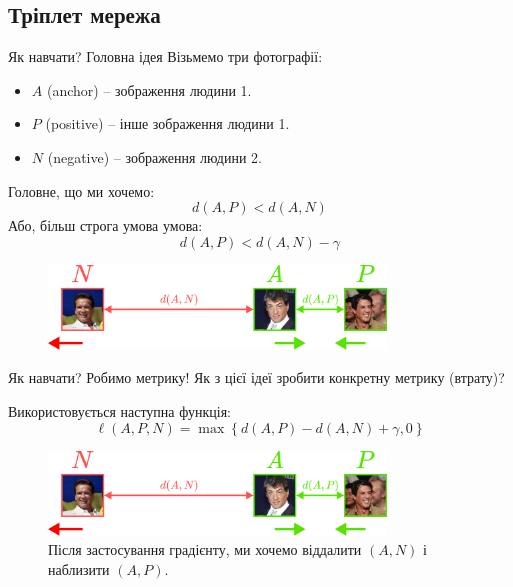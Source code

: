 \documentclass[xcolor={usenames,dvipsnames}]{beamer}
\begin{document}
    \subsection{Тріплет мережа}
    \begin{frame}{Як навчати? Головна ідея}
        Візьмемо три фотографії:
        \begin{itemize}
            \item $A$ (anchor) -- зображення людини 1.
            \item $P$ (positive) -- інше зображення людини 1.
            \item $N$ (negative) -- зображення людини 2.
        \end{itemize}
        Головне, що ми хочемо:
        \begin{equation*}
            d(A,P) < d(A,N)
        \end{equation*}
        Або, більш строга умова умова:
        \begin{equation*}
            d(A,P) < d(A,N) - \gamma
        \end{equation*}
        

        \begin{figure}
        \centering
            \includegraphics[width=0.8\textwidth]{images/triplet_dist.png}
        \end{figure}
    \end{frame}

    \begin{frame}{Як навчати? Робимо метрику!}
        Як з цієї ідеї зробити конкретну метрику (втрату)? 
        
        Використовується наступна функція:
        \begin{equation*}
            \ell(A,P,N) = \max\left\{d(A,P)-d(A,N)+\gamma,0\right\}
        \end{equation*}

        \begin{figure}
        \centering
            \includegraphics[width=0.8\textwidth]{images/triplet_dist.png}
            \caption{Після застосування градієнту, ми хочемо віддалити $(A,N)$ і наблизити $(A,P)$.}
        \end{figure}
    \end{frame}
\end{document}
